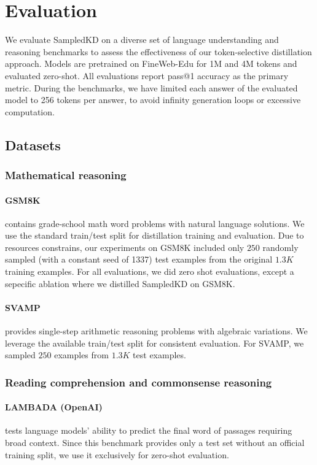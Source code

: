 \documentclass[11pt]{article}
\begin{document}
\section{Evaluation}
\label{sec:evaluation}

We evaluate SampledKD on a diverse set of language understanding and reasoning benchmarks to assess the effectiveness of our token-selective distillation approach.
Models are pretrained on FineWeb-Edu for 1M and 4M tokens and evaluated zero-shot.
All evaluations report pass@1 accuracy as the primary metric.
During the benchmarks, we have limited each answer of the evaluated model to 256 tokens per answer, to avoid infinity generation loops or excessive computation.

\subsection{Datasets}

\subsubsection{Mathematical reasoning}
\paragraph{GSM8K} \citep{cobbe2021gsm8k} contains grade-school math word problems with natural language solutions. We use the standard train/test split for distillation training and evaluation.
Due to resources constrains, our experiments on GSM8K included only $250$ randomly sampled (with a constant seed of 1337) test examples from the original $1.3K$ training examples.
For all evaluations, we did zero shot evaluations, except a sepecific ablation where we distilled SampledKD on GSM8K.
\paragraph{SVAMP} \citep{patel2021svamp} provides single-step arithmetic reasoning problems with algebraic variations. We leverage the available train/test split for consistent evaluation.
For SVAMP, we sampled $250$ examples from $1.3K$ test examples.

\subsubsection{Reading comprehension and commonsense reasoning}
\paragraph{LAMBADA (OpenAI)} \citep{paperno2016lambada} tests language models' ability to predict the final word of passages requiring broad context. Since this benchmark provides only a test set without an official training split, we use it exclusively for zero-shot evaluation.
\end{document}
